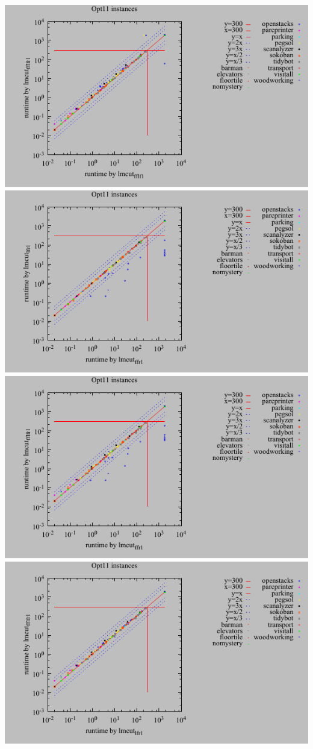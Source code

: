 \includegraphics{tables/opt11-time-lmcut_fflf-lmcut_fflfr.pdf}
\linebreak
\includegraphics{tables/opt11-time-lmcut_ffr-lmcut_lfr.pdf}
\linebreak
\includegraphics{tables/opt11-time-lmcut_ffr-lmcut_fflfr.pdf}
\linebreak
\includegraphics{tables/opt11-time-lmcut_lfr-lmcut_fflfr.pdf}
\linebreak
